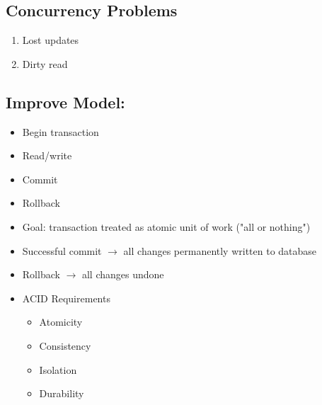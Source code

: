 \documentclass[12pt]{article}
\begin{document}
		\subsection*{Concurrency Problems}
		\begin{enumerate}
			\item
				Lost updates
			\item
				Dirty read
		\end{enumerate}
		\subsection*{Improve Model:}
			\begin{itemize}
				\item
					Begin transaction
				\item
					Read/write
				\item
					Commit
				\item
					Rollback
				\item
					Goal: transaction treated as atomic unit of work ("all or nothing")
				\item
					Successful commit $\rightarrow$ all changes permanently written to database
				\item
					Rollback $\rightarrow$ all changes undone
				\item
					ACID Requirements
					\begin{itemize}
						\item
							Atomicity
						\item
							Consistency
						\item
							Isolation
						\item
							Durability
					\end{itemize}
			\end{itemize}
\end{document}
